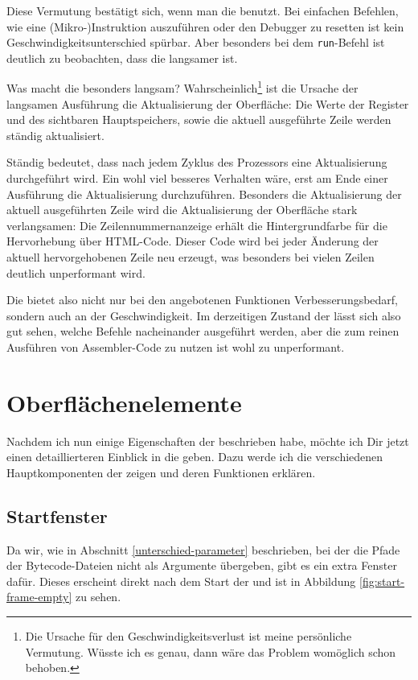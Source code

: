 Diese Vermutung bestätigt sich, wenn man die \mdg{} benutzt. Bei einfachen Befehlen, wie eine (Mikro-)Instruktion auszuführen oder den Debugger zu resetten ist kein Geschwindigkeitsunterschied spürbar. Aber besonders bei dem \texttt{run}-Befehl ist deutlich zu beobachten, dass die \mdg{} langsamer ist.

Was macht die \mdg{} besonders langsam? Wahrscheinlich\footnote{Die Ursache für den Geschwindigkeitsverlust ist meine persönliche Vermutung. Wüsste ich es genau, dann wäre das Problem womöglich schon behoben.} ist die Ursache der langsamen Ausführung die Aktualisierung der Oberfläche: Die Werte der Register und des sichtbaren Hauptspeichers, sowie die aktuell ausgeführte Zeile werden ständig aktualisiert.

Ständig bedeutet, dass nach jedem Zyklus des Prozessors eine Aktualisierung durchgeführt wird. Ein wohl viel besseres Verhalten wäre, erst am Ende einer Ausführung die Aktualisierung durchzuführen. Besonders die Aktualisierung der aktuell ausgeführten Zeile wird die Aktualisierung der Oberfläche stark verlangsamen: Die Zeilennummernanzeige erhält die Hintergrundfarbe für die Hervorhebung über HTML-Code. Dieser Code wird bei jeder Änderung der aktuell hervorgehobenen Zeile neu erzeugt, was besonders bei vielen Zeilen deutlich unperformant wird.

Die \mdg{} bietet also nicht nur bei den angebotenen Funktionen Verbesserungsbedarf, sondern auch an der Geschwindigkeit. Im derzeitigen Zustand der \mdg{} lässt sich also gut sehen, welche Befehle nacheinander ausgeführt werden, aber die \mdg{} zum reinen Ausführen von Assembler-Code zu nutzen ist wohl zu unperformant.

\section{Oberflächenelemente}
Nachdem ich nun einige Eigenschaften der \mdg{} beschrieben habe, möchte ich Dir jetzt einen detaillierteren Einblick in die \mdg{} geben. Dazu werde ich die verschiedenen Hauptkomponenten der \mdg{} zeigen und deren Funktionen erklären.

\subsection{Startfenster}
\label{startfenster}
Da wir, wie in Abschnitt \ref{unterschied-parameter} beschrieben, bei der \mdg{} die Pfade der Bytecode-Dateien nicht als Argumente übergeben, gibt es ein extra Fenster dafür. Dieses erscheint direkt nach dem Start der \mdg{} und ist in Abbildung \ref{fig:start-frame-empty} zu sehen.

